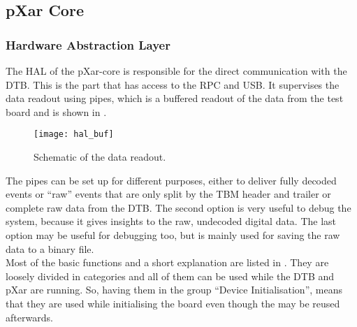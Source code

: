 \subsection{pXar Core}
\subsubsection{Hardware Abstraction Layer}
The \ac{HAL} of the pXar-core is responsible for the direct communication with the \ac{DTB}. This is the part that has access to the \ac{RPC} and USB. It supervises the data readout using pipes, which is a buffered readout of the data from the test board and is shown in .
\begin{figure}[ht]
	\vspace*{-5pt}
	\centering
	\texttt{[image: hal\_buf]}
	\caption{Schematic of the data readout.}
	\label{preadout}
	\vspace*{-5pt}
\end{figure}\no
The pipes can be set up for different purposes, either to deliver fully decoded events or ``raw'' events that are only split by the \ac{TBM} header and trailer or complete raw data from the \ac{DTB}. The second option is very useful to debug the system, because it gives insights to the raw, undecoded digital data. The last option may be useful for debugging too, but is mainly used for saving the raw data to a binary file.\\
Most of the basic functions and a short explanation are listed in . They are loosely divided in categories and all of them can be used while the \ac{DTB} and pXar are running. So, having them in the group ``Device Initialisation'', means that they are used while initialising the board even though the may be reused afterwards.
